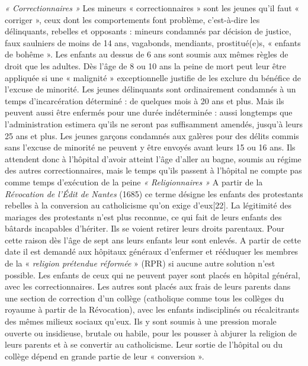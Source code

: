 \emph{« Correctionnaires »
}Les mineurs « correctionnaires » sont les jeunes qu'il faut « corriger », ceux dont les comportements font problème, c'est-à-dire les délinquants, rebelles et opposants : mineurs condamnés par décision de justice, faux saulniers de moins de 14 ans, vagabonds, mendiants, prostitué(e)s, « enfants de bohême ». Les enfants au dessus de 6 ans sont soumis aux mêmes règles de droit que les adultes. Dès l'âge de 8 ou 10 ans la peine de mort peut leur être appliquée si une « malignité » exceptionnelle justifie de les exclure du bénéfice de l'excuse de minorité. Les jeunes délinquants sont ordinairement condamnés à un temps d'incarcération déterminé : de quelques mois à 20 ans et plus. Mais ils peuvent aussi être enfermés pour une durée indéterminée : aussi longtemps que l'administration estimera qu'ils ne seront pas suffisamment amendés, jusqu'à leurs 25 ans et plus. Les jeunes garçons condamnés aux galères pour des délits commis sans l'excuse de minorité ne peuvent y être envoyés avant leurs 15 ou 16 ans. Ils attendent donc à l'hôpital d'avoir atteint l'âge d'aller au bagne, soumis au régime des autres correctionnaires, mais le temps qu'ils passent à l'hôpital ne compte pas comme temps d'exécution de la peine
\emph{« Religionnaires » 
} A partir de la \emph{Révocation de l'Édit de Nantes} (1685) ce terme désigne les enfants des protestants rebelles à la conversion au catholicisme qu'on exige d'eux[22]. La légitimité des mariages des protestants n'est plus reconnue, ce qui fait de leurs enfants des bâtards incapables d'hériter. Ils se voient retirer leurs droits parentaux. Pour cette raison dès l'âge de sept ans leurs enfants leur sont enlevés. 
 A partir de cette date il est demandé aux hôpitaux généraux d'enfermer et rééduquer les membres de la « \emph{religion prétendue réformée} » (RPR) si aucune autre solution n'est possible. Les enfants de ceux qui ne peuvent payer sont placés en hôpital général, avec les correctionnaires. Les autres sont placés aux frais de leurs parents dans une section de correction d'un collège (catholique comme tous les collèges du royaume à partir de la Révocation), avec les enfants indisciplinés ou récalcitrants des mêmes milieux sociaux qu'eux. Ils y sont soumis à une pression morale ouverte ou insidieuse, brutale ou habile, pour les pousser à abjurer la religion de leurs parents et à se convertir au catholicisme. Leur sortie de l'hôpital ou du collège dépend en grande partie de leur « conversion ». 
